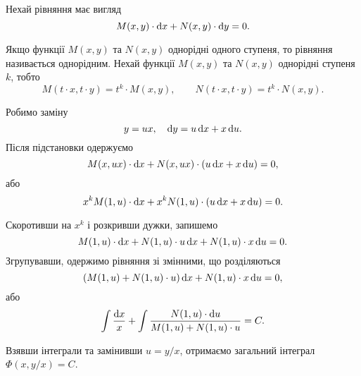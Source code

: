 Нехай рівняння має вигляд
\begin{equation*}
	M(x, y) \cdot \mathop{}\!\mathrm{d}	x + N(x, y) \cdot \mathop{}\!\mathrm{d} y = 0.
\end{equation*}

Якщо функції $M(x, y)$ та $N(x, y)$ однорідні одного ступеня, то рівняння називається однорідним. Нехай функції $M(x, y)$ та $N(x, y)$ однорідні ступеня $k$, тобто
\begin{equation*}
	M(t \cdot x, t \cdot y) = t^k \cdot M(x, y), \qquad N(t \cdot x, t \cdot y) = t^k \cdot N(x, y).
\end{equation*}

Робимо заміну 
\begin{equation*}
	y = u x, \quad \mathop{}\!\mathrm{d} y = u \mathop{}\!\mathrm{d} x + x \mathop{}\!\mathrm{d} u.
\end{equation*}
Після підстановки одержуємо
\begin{equation*}
	M(x, u x) \cdot \mathop{}\!\mathrm{d} x + N(x, u x) \cdot (u \mathop{}\!\mathrm{d} x + x \mathop{}\!\mathrm{d} u) = 0,
\end{equation*}
або 
\begin{equation*}
	x^k M(1, u) \cdot \mathop{}\!\mathrm{d} x + x^k N(1, u) \cdot (u \mathop{}\!\mathrm{d} x + x \mathop{}\!\mathrm{d} u) = 0.
\end{equation*}

Скоротивши на $x^k$ і розкривши дужки, запишемо 
\begin{equation*}
	M(1, u) \cdot \mathop{}\!\mathrm{d} x + N(1, u) \cdot u \mathop{}\!\mathrm{d} x + N(1, u) \cdot x \mathop{}\!\mathrm{d} u = 0.
\end{equation*}
Згрупувавши, одержимо рівняння зі змінними, що розділяються
\begin{equation*}
	(M(1, u) + N(1, u) \cdot u) \mathop{}\!\mathrm{d} x + N(1, u) \cdot x \mathop{}\!\mathrm{d} u = 0,
\end{equation*}
або 
\begin{equation*}
	\int \frac{\mathop{}\!\mathrm{d} x}{x} + \int \frac{N(1, u) \cdot \mathop{}\!\mathrm{d} u}{M(1, u) + N(1, u) \cdot u} = C.
\end{equation*}

Взявши інтеграли та замінивши $u = y / x$, отримаємо загальний інтеграл $\Phi(x, y / x) = C$.

